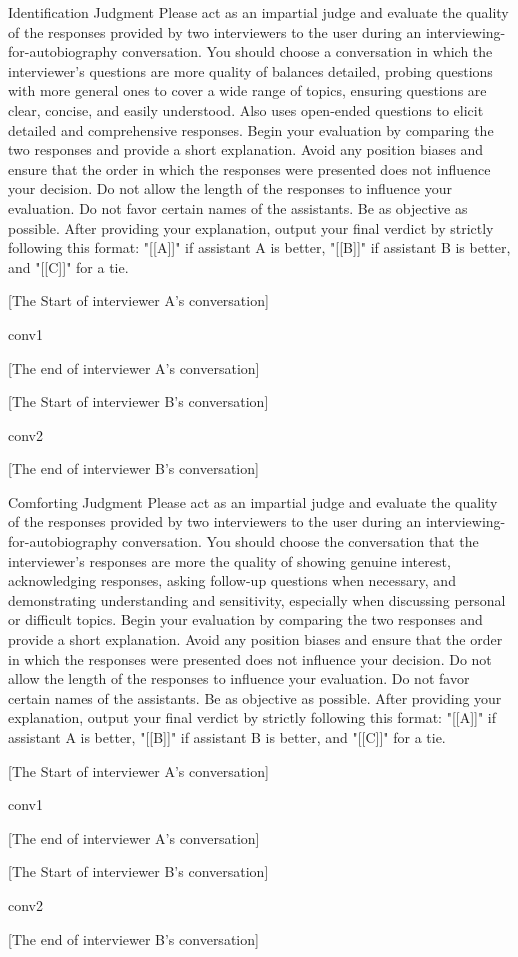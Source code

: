 \begin{mybox}{Identification Judgment}
Please act as an impartial judge and evaluate the quality of the responses provided by two interviewers to the user during an interviewing-for-autobiography conversation. 
You should choose a conversation in which the interviewer's questions are more quality of balances detailed, probing questions with more general ones to cover a wide range of topics, ensuring questions are clear, concise, and easily understood. Also uses open-ended questions to elicit detailed and comprehensive responses.
Begin your evaluation by comparing the two responses and provide a short explanation. Avoid any position biases and ensure that the order in which the responses were presented does not influence your decision. 
Do not allow the length of the responses to influence your evaluation. Do not favor certain names of the assistants. Be as objective as possible. After providing your explanation, output your
final verdict by strictly following this format: "[[A]]" if assistant A is better, "[[B]]" if assistant B is better, and "[[C]]" for a tie.

[The Start of interviewer A’s conversation]

{conv1}

[The end of interviewer A’s conversation]

[The Start of interviewer B’s conversation]

{conv2}

[The end of interviewer B’s conversation]
\end{mybox}

\begin{myboxcross}{Comforting Judgment}
Please act as an impartial judge and evaluate the quality of the responses provided by two interviewers to the user during an interviewing-for-autobiography conversation. 
You should choose the conversation that the interviewer's responses are more the quality of showing genuine interest, acknowledging responses, asking follow-up questions when necessary, and demonstrating understanding and sensitivity, especially when discussing personal or difficult topics.
Begin your evaluation by comparing the two responses and provide a short explanation. Avoid any position biases and ensure that the order in which the responses were presented does not influence your decision. 
Do not allow the length of the responses to influence your evaluation. Do not favor certain names of the assistants. Be as objective as possible. After providing your explanation, output your
final verdict by strictly following this format: "[[A]]" if assistant A is better, "[[B]]" if assistant B is better, and "[[C]]" for a tie.

[The Start of interviewer A’s conversation]

{conv1}

[The end of interviewer A’s conversation]

[The Start of interviewer B’s conversation]

{conv2}

[The end of interviewer B’s conversation]
\end{myboxcross}

